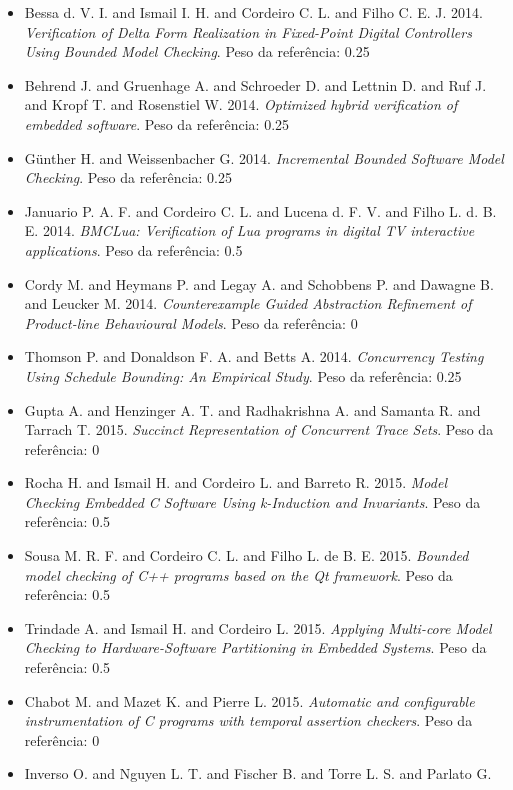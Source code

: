 \begin{itemize}
\item Bessa d. V. I. and Ismail I. H. and Cordeiro C. L. and Filho C. E. J.
      2014.
      {\it Verification of Delta Form Realization in Fixed-Point Digital Controllers Using Bounded Model Checking}.
      Peso da referência: 0.25
\item Behrend J. and Gruenhage A. and Schroeder D. and Lettnin D. and Ruf J. and Kropf T. and Rosenstiel W.
      2014.
      {\it Optimized hybrid verification of embedded software}.
      Peso da referência: 0.25
\item G\"{u}nther H. and Weissenbacher G.
      2014.
      {\it Incremental Bounded Software Model Checking}.
      Peso da referência: 0.25
\item Januario P. A. F. and Cordeiro C. L. and Lucena d. F. V. and Filho L. d. B. E.
      2014.
      {\it BMCLua: Verification of Lua programs in digital TV interactive applications}.
      Peso da referência: 0.5
\item Cordy M. and Heymans P. and Legay A. and Schobbens P. and Dawagne B. and Leucker M.
      2014.
      {\it Counterexample Guided Abstraction Refinement of Product-line Behavioural Models}.
      Peso da referência: 0
\item Thomson P. and Donaldson F. A. and Betts A.
      2014.
      {\it Concurrency Testing Using Schedule Bounding: An Empirical Study}.
      Peso da referência: 0.25
\item Gupta A. and Henzinger A. T. and Radhakrishna A. and Samanta R. and Tarrach T.
      2015.
      {\it Succinct Representation of Concurrent Trace Sets}.
      Peso da referência: 0
\item Rocha H. and Ismail H. and Cordeiro L. and Barreto R.
      2015.
      {\it Model Checking Embedded C Software Using k-Induction and Invariants}.
      Peso da referência: 0.5
\item Sousa M. R. F. and Cordeiro C. L. and Filho L. de B. E.
      2015.
      {\it Bounded model checking of C++ programs based on the Qt framework}.
      Peso da referência: 0.5
\item Trindade A. and Ismail H. and Cordeiro L.
      2015.
      {\it Applying Multi-core Model Checking to Hardware-Software Partitioning in Embedded Systems}.
      Peso da referência: 0.5
\item Chabot M. and Mazet K. and Pierre L.
      2015.
      {\it Automatic and configurable instrumentation of C programs with temporal assertion checkers}.
      Peso da referência: 0
\item Inverso O. and Nguyen L. T. and Fischer B. and Torre L. S. and Parlato G.

\end{itemize}
